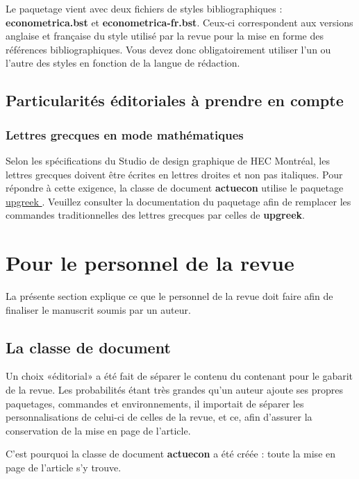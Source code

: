 \documentclass[french]{article}
\newcommand{\lien}[2]{%
	\href{#1}{#2 \faIcon{external-link-alt}}
}
\begin{document}
				Le paquetage vient avec deux fichiers de styles bibliographiques : \textbf{econometrica.bst} et 
				\textbf{econometrica-fr.bst}. Ceux-ci correspondent aux versions anglaise et française du style utilisé
				par la revue pour la mise en forme des références bibliographiques. Vous devez donc obligatoirement utiliser
				l'un ou l'autre des styles en fonction de la langue de rédaction.
				
		\subsection{Particularités éditoriales à prendre en compte}
		
			\subsubsection{Lettres grecques en mode mathématiques}
			
			Selon les spécifications du Studio de design graphique de HEC Montréal, les lettres grecques doivent
			être écrites en lettres droites et non pas italiques. Pour répondre à cette exigence, la classe de
			document \textbf{actuecon} utilise le paquetage \lien{http://mirrors.ctan.org/macros/latex/contrib/was/upgreek.pdf}{upgreek}.
			Veuillez consulter la documentation du paquetage afin de remplacer les commandes traditionnelles
			des lettres grecques par celles de \textbf{upgreek}.
	
	\section{Pour le personnel de la revue}
		\label{sec:personnel}
		
		La présente section explique ce que le personnel de la revue doit faire afin de finaliser le manuscrit soumis
		par un auteur.
		
		\subsection{La classe de document}
		
			Un choix «éditorial» a été fait de séparer le contenu du contenant pour le gabarit de la revue. Les probabilités
			étant très grandes qu'un auteur ajoute ses propres paquetages, commandes et environnements, il importait de
			séparer les personnalisations de celui-ci de celles de la revue, et ce, afin d'assurer la conservation de la mise en page de l'article.
			
			C'est pourquoi la classe de document \textbf{actuecon} a été créée : toute la mise en page de l'article s'y trouve.
			
\end{document}
